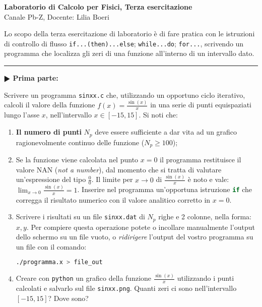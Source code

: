 \documentclass[11pt]{article}
\begin{document}
\pagestyle{empty}

\begin{center}
{\Large \bf  Laboratorio di Calcolo per Fisici, Terza esercitazione\\[2mm]}
{\large Canale Pb-Z, Docente: Lilia Boeri}
\end{center}
\vspace{4mm}

\begin{mdframed}[backgroundcolor=panna]
  Lo scopo della terza esercitazione di laboratorio \`e di fare pratica con
  le istruzioni di controllo di flusso \texttt{if...(then)...else}; \texttt{while...do};
\texttt{for...}, scrivendo un programma che localizza gli zeri di una funzione
all'interno di un intervallo dato.
  \end{mdframed}
%
%

\hrule
\vspace{2mm}
\textbf{$\RHD$ Prima parte:}

Scrivere un programma \texttt{sinxx.c} che, utilizzando un opportuno ciclo iterativo,
calcoli il valore della funzione $f(x)=\frac{\sin(x)}{x}$ in una serie di
punti equispaziati lungo l'asse $x$, nell'intervallo $x \in \left[-15,15 \right]$.
Si noti che:
\begin{enumerate}
\item  {\bf Il numero di punti} $N_{p}$ deve essere sufficiente a dar vita ad un grafico ragionevolmente continuo delle funzione ($N_p \ge 100$);
\item Se la funzione viene calcolata nel punto $x=0$ il programma restituisce il valore NAN (\emph{not a number}), 
dal momento che si tratta di valutare un'espressione del tipo $\frac{0}{0}$. Il limite per $x \to 0$ di 
$\frac{\sin(x)}{x}$ \`e noto e vale: $\lim_{x \to 0} \frac{\sin(x)}{x} = 1$.
Inserire nel programma un'opportuna  istruzione \lstinline[language=c]!if! che corregga il risultato numerico con il valore analitico corretto in $x=0$.
\item Scrivere i risultati su un file \texttt{sinxx.dat} di $N_p$ righe e 2 colonne, nella forma: $x,y$. Per compiere questa operazione potete o incollare manualmente l'output dello schermo su un file vuoto, o {\em ridirigere\/} l'output
del vostro programma su un file con il comando:
\\
\begin{lstlisting}[numbers=none,language=bash]
./programma.x > file_out
\end{lstlisting}
\item Creare con \texttt{python} un grafico della funzione $\frac{\sin(x)}{x}$
utilizzando i punti calcolati e salvarlo sul file \texttt{sinxx.png}. 
 Quanti zeri ci sono nell'intervallo $\left[ -15,15 \right]$? Dove sono?
\end{enumerate}
\end{document}
